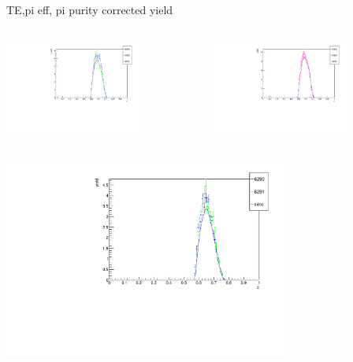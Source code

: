 \begin{frame}{TE,pi eff, pi purity corrected yield}
\begin{columns}
\begin{column}[T]{0.5\textwidth}
\includegraphics[width = 0.7\textwidth]{results/yield/check/yieldcheck_200_neg.pdf}
\end{column}
\begin{column}[T]{0.5\textwidth}
\includegraphics[width = 0.7\textwidth]{results/yield/check/yieldcheck_200_pos.pdf}
\end{column}
\end{columns}
\begin{columns}
\begin{column}[T]{0.5\textwidth}
\includegraphics[width = 0.7\textwidth]{results/yield/check/yieldcheck_190_neg.pdf}

\end{column}
\end{columns}
\end{frame}
